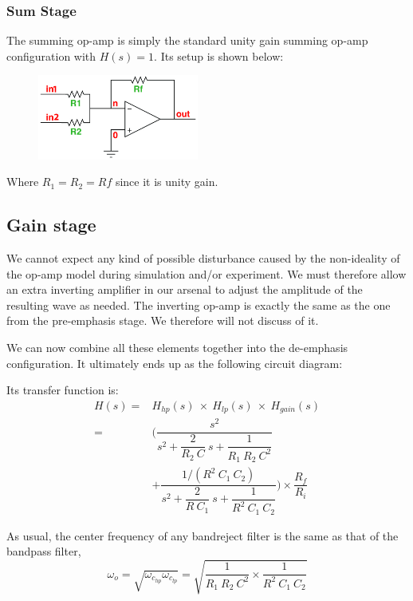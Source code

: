 \documentclass[a4paper]{IEEEtran}
\newcommand{\inv}[1]{\dfrac{1}{#1}}
\begin{document}
			\subsubsection{Sum Stage}
				The summing op-amp is simply the standard unity gain summing op-amp configuration with $H(s)=1$. Its setup is shown below:
				\begin{figure}[h!]
					\begin{center}
						\includegraphics[width=200px]{sum.jpg}
					\end{center}
				\end{figure}
				
			Where $R_1 = R_2 = Rf$ since it is unity gain.
			
			\subsection{Gain stage}
				We cannot expect any kind of possible disturbance caused by the non-ideality of the op-amp model during simulation and/or experiment. We must therefore allow an extra inverting amplifier in our arsenal to adjust the amplitude of the resulting wave as needed. The inverting op-amp is exactly the same as the one from the pre-emphasis stage. We therefore will not discuss of it.
				
			We can now combine all these elements together into the de-emphasis configuration. It ultimately ends up as the following circuit diagram:
			
			Its transfer function is:
			\begin{align}
				H(s) = & H_{hp}(s)~\times~H_{lp}(s)~\times~H_{gain}(s) \\
				= & \Bigg( \dfrac{s^2}{s^2+\dfrac{2}{R_2~C}~s+\inv{R_1~R_2~C^2}} \\ & + \dfrac{1/(R^2~C_1~C_2)}{s^2+\dfrac{2}{R~C_1}~s+\inv{R^2~C_1~C_2}} \Bigg) \times \dfrac{R_f}{R_i}
			\end{align}
			
			As usual, the center frequency of any bandreject filter is the same as that of the bandpass filter,
			\begin{equation}
				\omega_o = \sqrt{\omega_{c_{hp}} \omega_{c_{lp}}} = \sqrt{\inv{R_1~R_2~C^2} \times \inv{R^2~C_1~C_2}}
			\end{equation}
			
\end{document}

